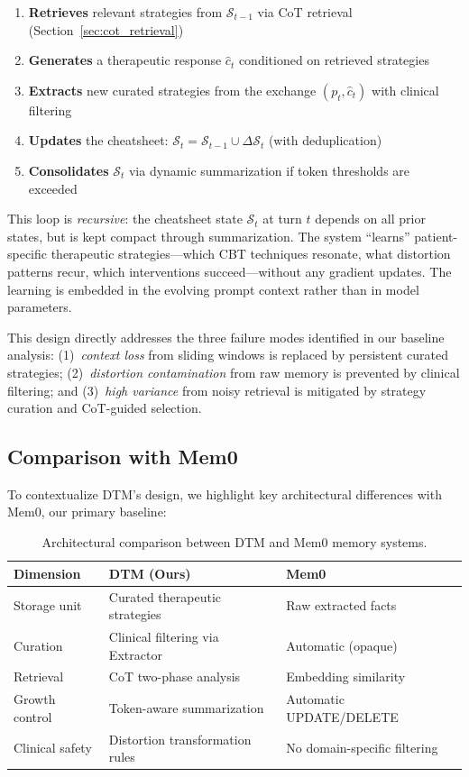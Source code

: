 \begin{enumerate}
    \item \textbf{Retrieves} relevant strategies from $\mathcal{S}_{t-1}$ via CoT retrieval (Section~\ref{sec:cot_retrieval})
    \item \textbf{Generates} a therapeutic response $\hat{c}_t$ conditioned on retrieved strategies
    \item \textbf{Extracts} new curated strategies from the exchange $(p_t, \hat{c}_t)$ with clinical filtering
    \item \textbf{Updates} the cheatsheet: $\mathcal{S}_t = \mathcal{S}_{t-1} \cup \Delta\mathcal{S}_t$ (with deduplication)
    \item \textbf{Consolidates} $\mathcal{S}_t$ via dynamic summarization if token thresholds are exceeded
\end{enumerate}

This loop is \emph{recursive}: the cheatsheet state $\mathcal{S}_t$ at turn $t$ depends on all prior states, but is kept compact through summarization. The system ``learns'' patient-specific therapeutic strategies---which CBT techniques resonate, what distortion patterns recur, which interventions succeed---without any gradient updates. The learning is embedded in the evolving prompt context rather than in model parameters.

This design directly addresses the three failure modes identified in our baseline analysis: (1)~\emph{context loss} from sliding windows is replaced by persistent curated strategies; (2)~\emph{distortion contamination} from raw memory is prevented by clinical filtering; and (3)~\emph{high variance} from noisy retrieval is mitigated by strategy curation and CoT-guided selection.

\subsection{Comparison with Mem0}

To contextualize DTM's design, we highlight key architectural differences with Mem0, our primary baseline:

\begin{table}[h]
\centering
\caption{Architectural comparison between DTM and Mem0 memory systems.}
\label{tab:architecture}
\small
\begin{tabular}{lll}
\toprule
\textbf{Dimension} & \textbf{DTM (Ours)} & \textbf{Mem0} \\
\midrule
Storage unit & Curated therapeutic strategies & Raw extracted facts \\
Curation & Clinical filtering via Extractor & Automatic (opaque) \\
Retrieval & CoT two-phase analysis & Embedding similarity \\
Growth control & Token-aware summarization & Automatic UPDATE/DELETE \\
Clinical safety & Distortion transformation rules & No domain-specific filtering \\
\bottomrule
\end{tabular}
\end{table}

